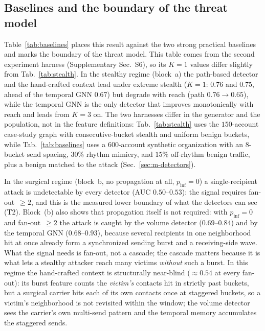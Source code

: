 \subsection{Baselines and the boundary of the threat model}
\label{sec:res-baselines}
Table~\ref{tab:baselines} places this result against the two strong practical baselines and marks the boundary
of the threat model. This table comes from the second experiment harness (Supplementary Sec.~S6), so its
$K{=}1$ values differ slightly from Tab.~\ref{tab:stealth}. In the stealthy regime (block~a) the
path-based detector and the hand-crafted context lead under extreme stealth ($K{=}1$: $0.76$ and $0.75$,
ahead of the temporal GNN $0.67$) but degrade with reach (path $0.76\!\to\!0.65$), while the temporal GNN is
the only detector that improves monotonically with reach and leads from $K{=}3$ on. The two harnesses
differ in the generator and the population, not in the feature definitions: Tab.~\ref{tab:stealth} uses the
$150$-account case-study graph with consecutive-bucket stealth and uniform benign buckets, while
Tab.~\ref{tab:baselines} uses a $600$-account synthetic organization with an $8$-bucket send spacing,
$30\%$ rhythm mimicry, and $15\%$ off-rhythm benign traffic, plus a benign matched to the attack
(Sec.~\ref{sec:m-detectors}).

In the surgical regime (block~b, no propagation at all, $p_\mathrm{inf}{=}0$) a single-recipient
attack is undetectable by every detector (AUC $0.50$--$0.53$): the signal requires fan-out~$\ge2$, and this is
the measured lower boundary of what the detectors can see (T2). Block~(b) also shows that propagation itself
is not required: with $p_\mathrm{inf}{=}0$ and fan-out~$\ge2$ the attack is caught by the volume detector
($0.69$--$0.84$) and by the temporal GNN ($0.68$--$0.93$), because several recipients in one neighborhood hit
at once already form a synchronized sending burst and a receiving-side wave. What the signal needs is
fan-out, not a cascade; the cascade matters because it is what lets a stealthy attacker reach many victims
\emph{without} such a burst. In this regime the hand-crafted context is structurally near-blind
($\approx\!0.54$ at every fan-out): its burst feature counts the \emph{victim's} contacts hit in strictly
past buckets, but a surgical carrier hits each of its own contacts once at staggered buckets, so a victim's
neighborhood is not revisited within the window; the volume detector sees the carrier's own multi-send
pattern and the temporal memory accumulates the staggered sends.

